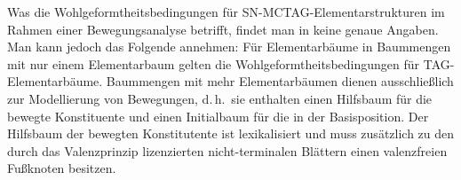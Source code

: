 Was die Wohlgeformtheitsbedingungen für SN-MCTAG-Elementarstrukturen im Rahmen einer Bewegungsanalyse betrifft, findet man in \cite{Kallmeyer:05} keine genaue Angaben. Man kann jedoch das Folgende annehmen: Für Elementarbäume in Baummengen mit nur einem Elementarbaum gelten die Wohlgeformtheitsbedingungen für TAG-Elementarbäume. Baummengen mit mehr Elementarbäumen dienen ausschlie\ss lich zur Modellierung von Bewegungen, d.\,h.\ sie enthalten einen Hilfsbaum für die bewegte Konstituente und einen Initialbaum für die  in der Basisposition. Der Hilfsbaum der bewegten Konstitutente ist lexikalisiert und muss zusätzlich zu den durch das Valenzprinzip lizenzierten nicht-terminalen Blättern einen valenzfreien Fu\ss knoten besitzen.%

